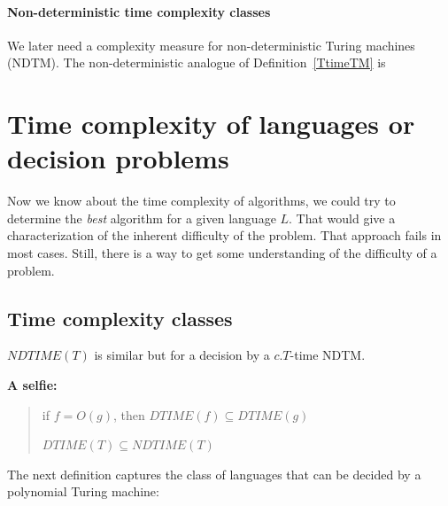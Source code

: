 \begin{sloppypar}
\paragraph{Non-deterministic time complexity classes}
We later need a complexity measure for non-deterministic Turing
machines (NDTM). The non-deterministic analogue of
Definition~\ref{TtimeTM} is
\end{sloppypar}



\section{Time complexity of languages or decision problems}


Now we know about the time complexity of algorithms, we could try to
determine the {\em best} algorithm for a given language $L$. That
would give a characterization of the inherent difficulty of the
problem. That approach fails in most cases. Still, there is a way to
get some understanding of the difficulty of a problem.

\subsection{Time complexity classes}





$NDTIME(T)$ is similar but for a decision by a $c.T$-time NDTM.

{\bf A selfie:}
\begin{verse}
if $f = O(g)$, then $DTIME(f) \subseteq DTIME(g)$

$DTIME(T) \subseteq NDTIME(T)$
\end{verse}

The next definition captures the class of languages that can be
decided by a polynomial Turing machine:

